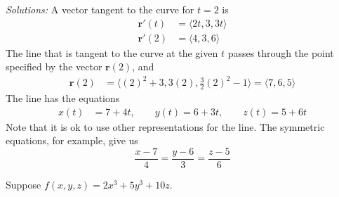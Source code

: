     \ifnum {} {\color{DarkBlue} \textit{Solutions:} 
    A vector tangent to the curve for $t=2$ is
        \begin{align}
            \mathbf r'(t) &= \langle 2t, 3, 3t \rangle  \\
            \mathbf r'(2) &= \langle 4, 3, 6 \rangle      
        \end{align}
    The line that is tangent to the curve at the given $t$ passes through the point specified by the vector $\mathbf r(2)$, and \begin{align}
        \mathbf r(2) &= \langle (2)^2 + 3, 3(2), \frac32 (2)^2 -1 \rangle = \langle 7, 6, 5 \rangle
    \end{align} 
    The line has the equations
    \begin{align}
        x(t) &= 7+4t, \qquad y(t) = 6+3t, \qquad z(t) = 5+6t
    \end{align}
    Note that it is ok to use other representations for the line. The symmetric equations, for example, give us $$\frac{x-7}{4} = \frac{y-6}{3} = \frac{z-5}{6}$$
    }
    \else
    \vspace{9cm}
    \fi     
\fi 

\ifnum {}
\question[4] Suppose $f(x,y,z) = 2x^3+5y^3+10z$. 


